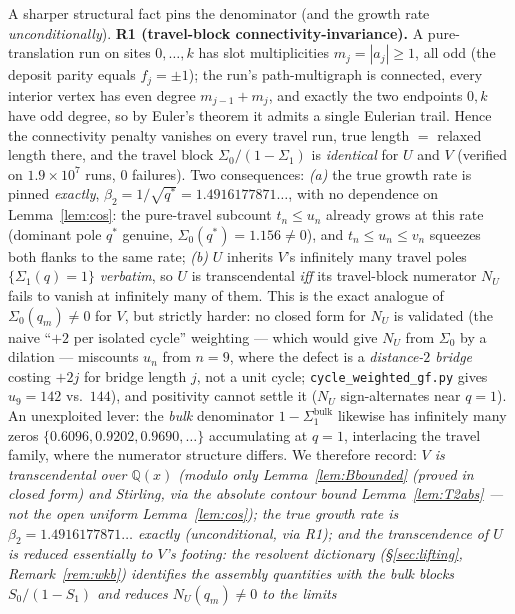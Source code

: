 \begin{remark}
A sharper structural fact pins the denominator (and the growth rate
\emph{unconditionally}). \textbf{R1 (travel-block connectivity-invariance).} A
pure-translation run on sites $0,\dots,k$ has slot multiplicities $m_j=|a_j|\ge1$,
all odd (the deposit parity equals $f_j=\pm1$); the run's path-multigraph is
connected, every interior vertex has even degree $m_{j-1}+m_j$, and exactly the two
endpoints $0,k$ have odd degree, so by Euler's theorem it admits a single Eulerian
trail. Hence the connectivity penalty vanishes on every travel run, true length $=$
relaxed length there, and the travel block $\Sigma_0/(1-\Sigma_1)$ is \emph{identical}
for $U$ and $V$ (verified on $1.9\times10^{7}$ runs, $0$ failures). Two consequences:
\emph{(a)} the true growth rate is pinned \emph{exactly}, $\beta_2=1/\sqrt{q^{\ast}}
=1.4916177871\ldots$, with no dependence on Lemma~\ref{lem:cos}: the pure-travel
subcount $t_n\le u_n$ already grows at this rate (dominant pole $q^{\ast}$ genuine,
$\Sigma_0(q^{\ast})=1.156\ne0$), and $t_n\le u_n\le v_n$ squeezes both flanks to the
same rate; \emph{(b)} $U$ inherits $V$'s infinitely many travel poles
$\{\Sigma_1(q)=1\}$ \emph{verbatim}, so $U$ is transcendental \emph{iff} its
travel-block numerator $N_U$ fails to vanish at infinitely many of them. This is the
exact analogue of $\Sigma_0(q_m)\ne0$ for $V$, but strictly harder: no closed form
for $N_U$ is validated (the naive ``$+2$ per isolated cycle'' weighting --- which
would give $N_U$ from $\Sigma_0$ by a dilation --- miscounts $u_n$ from $n=9$, where
the defect is a \emph{distance-$2$ bridge} costing $+2j$ for bridge length $j$, not a
unit cycle; \texttt{cycle\_weighted\_gf.py} gives $u_9=142$ vs.\ $144$), and
positivity cannot settle it ($N_U$ sign-alternates near $q=1$). An unexploited lever:
the \emph{bulk} denominator $1-\Sigma_1^{\mathrm{bulk}}$ likewise has infinitely many
zeros $\{0.6096,0.9202,0.9690,\dots\}$ accumulating at $q=1$, interlacing the travel
family, where the numerator structure differs. We therefore record: \emph{$V$ is
transcendental over $\mathbb Q(x)$ \textup(modulo only Lemma~\ref{lem:Bbounded}
\textup{(proved in closed form)} and Stirling, via the absolute contour bound
Lemma~\ref{lem:T2abs} --- not the open uniform Lemma~\ref{lem:cos}\textup); the true growth rate is $\beta_2=1.4916177871\ldots$
exactly \textup(unconditional, via R1\textup); and the transcendence of $U$ is
\emph{reduced essentially to $V$'s footing}: the resolvent dictionary
(\S\ref{sec:lifting}, Remark~\ref{rem:wkb}) identifies the assembly quantities with
the bulk blocks $S_0/(1-S_1)$ and reduces $N_U(q_m)\ne0$ to the limits
}
\end{remark}
